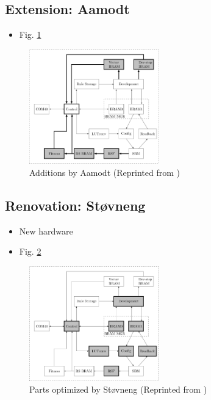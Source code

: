 \documentclass[a4paper]{IEEEtran}
\begin{document}
\subsection{Extension: Aamodt \cite{aamodt2005sblock}}

\begin{itemize}
    \item Fig. \ref{fig:ca-aamodt}
\end{itemize}

\begin{figure}[!ht]
    \centering
    \includegraphics[width=0.5\textwidth]{figures/ca-aamodt}
    \caption{Additions by Aamodt (Reprinted from \cite{stovneng2014sblock})}
    \label{fig:ca-aamodt}
\end{figure}

\subsection{Renovation: Støvneng \cite{stovneng2014sblock}}

\begin{itemize}
    \item New hardware
    \item Fig. \ref{fig:ca-stovneng}
\end{itemize}

\begin{figure}[!ht]
    \centering
    \includegraphics[width=0.5\textwidth]{figures/ca-stovneng}
    \caption{Parts optimized by Støvneng (Reprinted from \cite{stovneng2014sblock})}
    \label{fig:ca-stovneng}
\end{figure}
\end{document}
